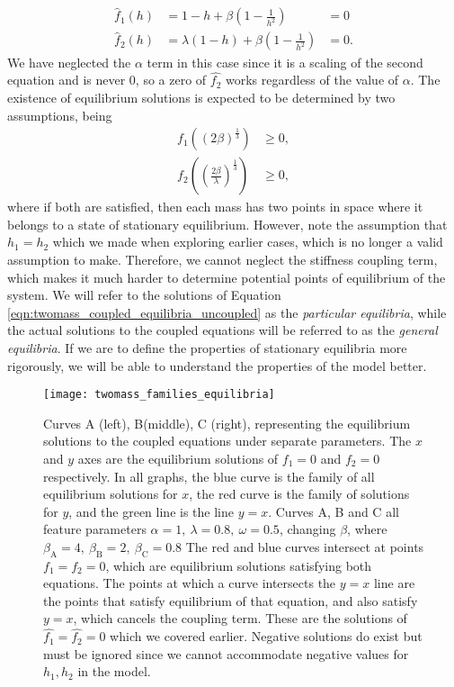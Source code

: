 \documentclass{article}
\begin{document}
\begin{equation}
    \begin{aligned}
        \hat{f}_1(h) &= 1 - h + \beta\left( 1-\frac{1}{h^2} \right) &= 0 \\
        \hat{f}_2(h) &= \lambda(1-h) + \beta\left( 1-\frac{1}{h^2} \right) &= 0.
    \end{aligned}
    \label{eqn:twomass_coupled_equilibria_uncoupled}
\end{equation}
We have neglected the \(\alpha\) term in this case since it is a scaling of the second equation and is never $0$,
so a zero of \(\hat{f_2}\) works regardless of the value of \(\alpha\).
The existence of equilibrium solutions is expected to be determined by two assumptions, being
\begin{align*}
    f_1 \left( (2\beta)^\frac{1}{3} \right) &\ge 0, \\
    f_2 \left( \left( \frac{2\beta}{\lambda} \right)^\frac{1}{3} \right) &\ge 0,
\end{align*}
where if both are satisfied, then each mass has two points in space where it belongs to a state of stationary equilibrium.
However, note the assumption that \(h_1=h_2\) which we made when exploring earlier cases,
which is no longer a valid assumption to make. 
Therefore, we cannot neglect the stiffness coupling term,
which makes it much harder to determine potential points of equilibrium of the system.
We will refer to the solutions of Equation \ref{eqn:twomass_coupled_equilibria_uncoupled} as the \textit{particular equilibria},
while the actual solutions to the coupled equations will be referred to as the \textit{general equilibria}.
If we are to define the properties of stationary equilibria more rigorously,
we will be able to understand the properties of the model better.
\begin{figure}
    \centering
    \texttt{[image: twomass\_families\_equilibria]}
    \caption{
        Curves A (left), B(middle), C (right), representing the equilibrium solutions to the coupled equations under separate parameters.
        The $x$ and $y$ axes are the equilibrium solutions of $f_1 = 0$ and $f_2=0$ respectively. 
        In all graphs, the blue curve is the family of all equilibrium solutions for $x$,
        the red curve is the family of solutions for $y$,
        and the green line is the line $y=x$.
        Curves A, B and C all feature parameters \(\alpha = 1,~\lambda=0.8,~\omega = 0.5\), changing $\beta$,
        where \(\beta_\mathrm{A} = 4,~\beta_\mathrm{B} = 2,~\beta_\mathrm{C} = 0.8\)
        The red and blue curves intersect at points $f_1=f_2=0$,
        which are equilibrium solutions satisfying both equations.
        The points at which a curve intersects the $y=x$ line are the points that satisfy equilibrium of that equation, and also satisfy $y=x$,
        which cancels the coupling term.
        These are the solutions of $\hat{f_1}=\hat{f_2}=0$ which we covered earlier.
        Negative solutions do exist but must be ignored since we cannot accommodate negative values for $h_1, h_2$ in the model.
    }
    \label{fig:twomass_equilibrium_curves}
\end{figure}
\end{document}
